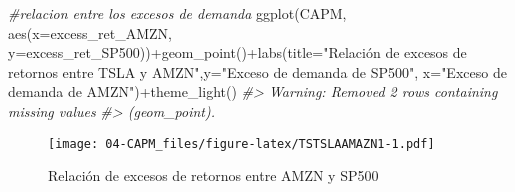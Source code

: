 \documentclass[
]{book}
\newenvironment{Shaded}{\begin{snugshade}}{\end{snugshade}}
\newcommand{\AttributeTok}[1]{\textcolor[rgb]{0.77,0.63,0.00}{#1}}
\newcommand{\CommentTok}[1]{\textcolor[rgb]{0.56,0.35,0.01}{\textit{#1}}}
\newcommand{\FloatTok}[1]{\textcolor[rgb]{0.00,0.00,0.81}{#1}}
\newcommand{\FunctionTok}[1]{\textcolor[rgb]{0.00,0.00,0.00}{#1}}
\newcommand{\NormalTok}[1]{#1}
\newcommand{\OtherTok}[1]{\textcolor[rgb]{0.56,0.35,0.01}{#1}}
\newcommand{\SpecialCharTok}[1]{\textcolor[rgb]{0.00,0.00,0.00}{#1}}
\newcommand{\StringTok}[1]{\textcolor[rgb]{0.31,0.60,0.02}{#1}}
\begin{document}
\begin{Shaded}
\end{Shaded}

\begin{Shaded}
\begin{Highlighting}[]
\CommentTok{\#relacion entre los excesos de demanda}
\FunctionTok{ggplot}\NormalTok{(CAPM, }\FunctionTok{aes}\NormalTok{(}\AttributeTok{x=}\NormalTok{excess\_ret\_AMZN, }\AttributeTok{y=}\NormalTok{excess\_ret\_SP500))}\SpecialCharTok{+}\FunctionTok{geom\_point}\NormalTok{()}\SpecialCharTok{+}\FunctionTok{labs}\NormalTok{(}\AttributeTok{title=}\StringTok{"Relación de excesos de retornos entre TSLA y AMZN"}\NormalTok{,}\AttributeTok{y=}\StringTok{"Exceso de demanda de SP500"}\NormalTok{, }\AttributeTok{x=}\StringTok{"Exceso de demanda de AMZN"}\NormalTok{)}\SpecialCharTok{+}\FunctionTok{theme\_light}\NormalTok{()}
\CommentTok{\#\textgreater{} Warning: Removed 2 rows containing missing values}
\CommentTok{\#\textgreater{} (geom\_point).}
\end{Highlighting}
\end{Shaded}

\begin{figure}
\centering
\texttt{[image: 04-CAPM\_files/figure-latex/TSTSLAAMAZN1-1.pdf]}
\caption{\label{fig:TSTSLAAMAZN1}Relación de excesos de retornos entre AMZN y SP500}
\end{figure}
\end{document}
